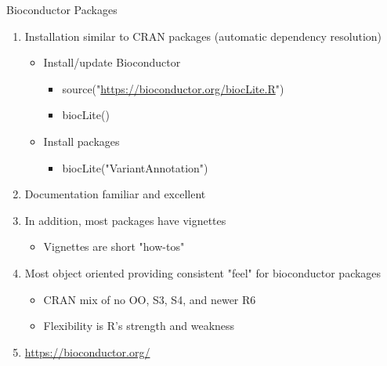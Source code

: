 \documentclass[t,10pt]{beamer}
\begin{document}
\begin{frame}[label={sec:orgheadline3}]{Bioconductor Packages}
\begin{enumerate}[<+->]
\item Installation similar to CRAN packages (\alert{automatic dependency resolution})
\begin{itemize}
\item Install/update Bioconductor
\begin{itemize}
\item source("\url{https://bioconductor.org/biocLite.R}")
\item biocLite()
\end{itemize}
\item Install packages
\begin{itemize}
\item biocLite("VariantAnnotation")
\end{itemize}
\end{itemize}
\item Documentation familiar and excellent
\item In addition, most packages have vignettes
\begin{itemize}
\item Vignettes are short "how-tos"
\end{itemize}
\item Most object oriented providing consistent "feel" for bioconductor packages
\begin{itemize}
\item CRAN mix of no OO, S3, S4, and newer R6
\item Flexibility is R's strength and weakness
\end{itemize}
\item \url{https://bioconductor.org/}
\end{enumerate}
\end{frame}
\end{document}
